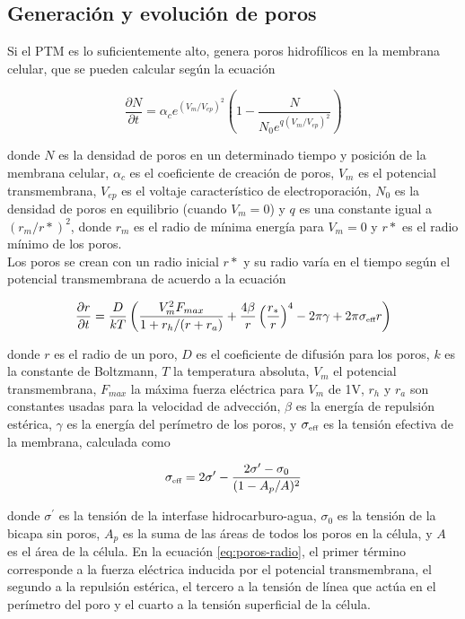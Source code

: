 \subsection*{Generación y evolución de poros}
Si el PTM es lo suficientemente alto, genera poros hidrofílicos en la membrana celular, que se pueden calcular según la ecuación

\begin{equation} \label{eq:poros-crea}
	\frac{\partial N}{\partial t} = \alpha_c e^{(V_m/V_{ep})^2} \left( 1 - \frac{N}{N_0 e^{q \left(V_m/V_{ep} \right) ^2}} \right)
\end{equation}

donde $N$ es la densidad de poros en un determinado tiempo y posición de la membrana celular, $\alpha_c$ es el coeficiente de creación de poros, $V_m$ es el potencial transmembrana, $V_{ep}$ es el voltaje característico de electroporación, $N_0$ es la densidad de poros en equilibrio (cuando $V_m = 0$) y $q$ es una constante igual a $(r_m / r*)^2$, donde $r_m$ es el radio de mínima energía para $V_m = 0$ y $r*$ es el radio mínimo de los poros.\\

Los poros se crean con un radio inicial $r*$ y su radio varía en el tiempo según el potencial transmembrana de acuerdo a la ecuación

\begin{equation} \label{eq:poros-radio}
	\frac{\partial r}{\partial t} = \frac{D}{kT} \left( \frac{V_m^2 F_{max}}{1+r_h / (r+r_a)} + \frac{4 \beta}{r} \left(\frac{r_*}{r}\right)^4 - 2 \pi \gamma + 2 \pi \sigma_{\textrm{\tiny eff}} r\right)
\end{equation}

donde $r$ es el radio de un poro, $D$ es el coeficiente de difusión para los poros, $k$ es la constante de Boltzmann, $T$ la temperatura absoluta, $V_m$ el potencial transmembrana, $F_{max}$ la máxima fuerza eléctrica para $V_m$ de 1V, $r_h$ y $r_a$ son constantes usadas para la velocidad de advección, $\beta$ es la energía de repulsión estérica, $\gamma$ es la energía del perímetro de los poros, y $\sigma_{\textrm{\tiny eff}}$ es la tensión efectiva de la membrana, calculada como

\begin{equation}
	\sigma_{\textrm{\tiny eff}} = 2 \sigma^\prime - \frac{2 \sigma^\prime - \sigma_0}{(1 - A_p / A)^2}
\end{equation}

donde $\sigma^\prime$ es la tensión de la interfase hidrocarburo-agua, $\sigma_0$ es la tensión de la bicapa sin poros, $A_p$ es la suma de las áreas de todos los poros en la célula, y $A$ es el área de la célula. En la ecuación \ref{eq:poros-radio}, el primer término corresponde a la fuerza eléctrica inducida por el potencial transmembrana, el segundo a la repulsión estérica, el tercero a la tensión de línea que actúa en el perímetro del poro y el cuarto a la tensión superficial de la célula.\\

